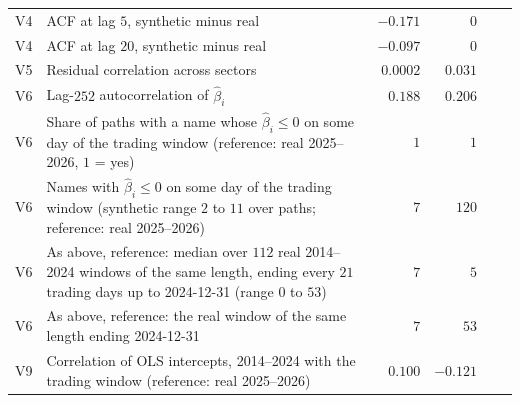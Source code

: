 \begin{table}[H]
\begin{tabular}{@{}l p{6.3cm} r r l l@{}}
V4 & ACF at lag $5$, synthetic minus real & $-0.171$ & $0$ & & \\
V4 & ACF at lag $20$, synthetic minus real & $-0.097$ & $0$ & & \\
V5 & Residual correlation across sectors & $0.0002$ & $0.031$ & & \\
V6 & Lag-$252$ autocorrelation of $\hat\beta_i$ & $0.188$ & $0.206$ & & \\
V6 & Share of paths with a name whose $\hat\beta_i \le 0$ on some day of the trading window (reference: real
  2025--2026, $1$ = yes) & $1$ & $1$ & & \\
V6 & Names with $\hat\beta_i \le 0$ on some day of the trading window (synthetic range $2$ to $11$ over paths;
  reference: real 2025--2026) & $7$ & $120$ & & \\
V6 & As above, reference: median over $112$ real 2014--2024 windows of the same length, ending every $21$ trading
  days up to 2024-12-31 (range $0$ to $53$) & $7$ & $5$ & & \\
V6 & As above, reference: the real window of the same length ending 2024-12-31 & $7$ & $53$ & & \\
V9 & Correlation of OLS intercepts, 2014--2024 with the trading window (reference: real 2025--2026) & $0.100$ &
  $-0.121$ & & \\
\bottomrule
\end{tabular}
\end{table}
